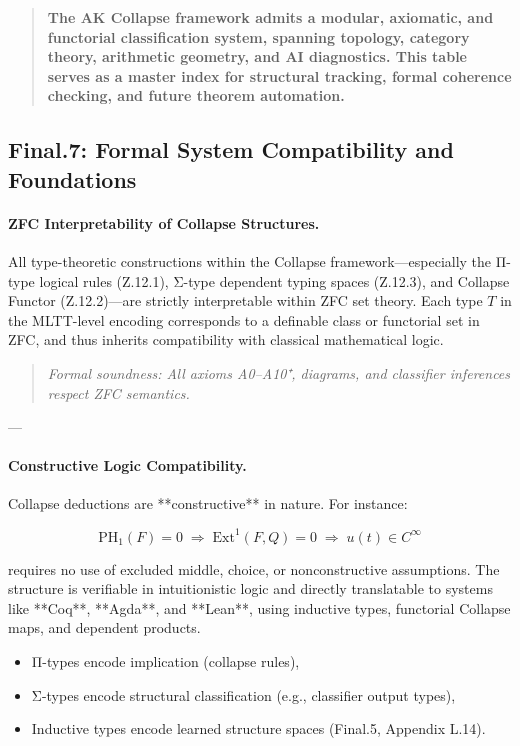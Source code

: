 \documentclass[11pt]{article}
\begin{document}
\begin{axiom}
\begin{axiom}
{{\begin{quote}
\textbf{The AK Collapse framework admits a modular, axiomatic, and functorial classification system,  
spanning topology, category theory, arithmetic geometry, and AI diagnostics.  
This table serves as a master index for structural tracking, formal coherence checking,  
and future theorem automation.}
\end{quote}




\subsection*{Final.7: Formal System Compatibility and Foundations}

\paragraph{ZFC Interpretability of Collapse Structures.}  
All type-theoretic constructions within the Collapse framework—especially the Π-type logical rules (Z.12.1),  
Σ-type dependent typing spaces (Z.12.3), and Collapse Functor (Z.12.2)—are strictly interpretable within ZFC set theory.  
Each type \( T \) in the MLTT-level encoding corresponds to a definable class or functorial set in ZFC,  
and thus inherits compatibility with classical mathematical logic.  

\begin{quote}
\textit{Formal soundness: All axioms A0–A10⁺, diagrams, and classifier inferences respect ZFC semantics.}
\end{quote}

---

\paragraph{Constructive Logic Compatibility.}  
Collapse deductions are **constructive** in nature. For instance:

\[
\mathrm{PH}_1(F) = 0 \;\Rightarrow\; \mathrm{Ext}^1(F,Q) = 0 \;\Rightarrow\; u(t) \in C^\infty
\]

requires no use of excluded middle, choice, or nonconstructive assumptions.  
The structure is verifiable in intuitionistic logic and directly translatable to systems like **Coq**, **Agda**, and **Lean**,  
using inductive types, functorial Collapse maps, and dependent products.

\begin{itemize}
  \item Π-types encode implication (collapse rules),
  \item Σ-types encode structural classification (e.g., classifier output types),
  \item Inductive types encode learned structure spaces (Final.5, Appendix L.14).
\end{itemize}

}}
\end{axiom}
\end{axiom}
\end{document}

